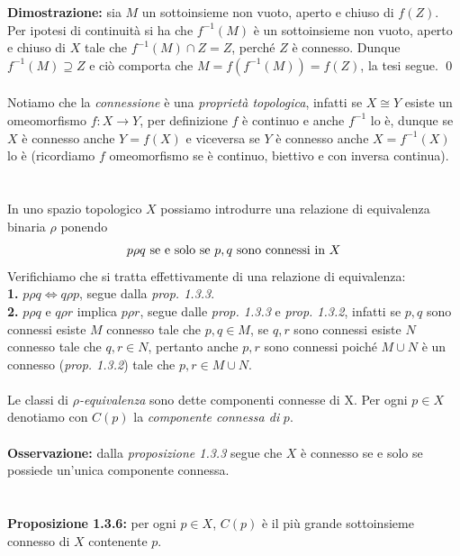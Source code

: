 \documentclass{article}
\begin{document}
\textbf{Dimostrazione:} sia $M$ un sottoinsieme non vuoto, aperto e chiuso di $f(Z)$. Per ipotesi di continuità si ha che $f^{-1}(M)$ è un sottoinsieme non vuoto, aperto e chiuso di $X$ tale che $f^{-1}(M) \cap Z = Z$, perché $Z$ è connesso. Dunque $f^{-1}(M) \supseteq Z$ e ciò comporta che $M = f(f^{-1}(M)) = f(Z)$, la tesi segue. \qed \\ \\
Notiamo che la \textit{connessione} è una \textit{proprietà topologica}, infatti se $X \cong Y$ esiste un omeomorfismo $f : X \longrightarrow Y$, per definizione $f$ è continuo e anche $f^{-1}$ lo è, dunque se $X$ è connesso anche $Y = f(X)$ e viceversa se $Y$ è connesso anche $X = f^{-1}(X)$ lo è (ricordiamo $f$ omeomorfismo se è continuo, biettivo e con inversa continua). \\ \\ \\
In uno spazio topologico $X$ possiamo introdurre una relazione di equivalenza binaria $\rho$ ponendo
\begin{gather}
    p \rho q \text{ se e solo se } p,q \text{ sono connessi in } X \notag
\end{gather}
Verifichiamo che si tratta effettivamente di una relazione di equivalenza: \\
\textbf{1.} $p \rho q \iff q \rho p$, segue dalla \textit{prop. 1.3.3}. \\
\textbf{2.} $p \rho q$ e $q \rho r$ implica $p \rho r$, segue dalle \textit{prop. 1.3.3} e \textit{prop. 1.3.2}, infatti se $p, q$ sono connessi esiste $M$ connesso tale che $p, q \in M$, se $q, r$ sono connessi esiste $N$ connesso tale che $q, r \in N$, pertanto anche $p, r$ sono connessi poiché $M \cup N$ è un connesso (\textit{prop. 1.3.2}) tale che $p, r \in M \cup N$. \\ \\
Le classi di $\rho$\textit{-equivalenza} sono dette componenti connesse di X. Per ogni $p \in X$ denotiamo con $C(p)$ la \textit{componente connessa di} $p$. \\ \\
\textbf{Osservazione:} dalla \textit{proposizione 1.3.3} segue che $X$ è connesso se e solo se possiede un'unica componente connessa. \\ \\ \\
\textbf{Proposizione 1.3.6:} per ogni $p \in X$, $C(p)$ è il più grande sottoinsieme connesso di $X$ contenente $p$. \\
\end{document}
